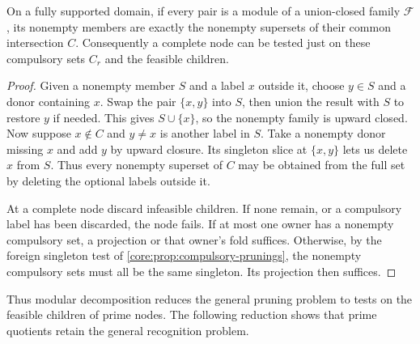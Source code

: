 \begin{proposition}
\label{core:prop:complete-pruning-modules}
On a fully supported domain, if every pair is a module of a
union-closed family $\mathcal F$, its nonempty members are exactly
the nonempty supersets of their common intersection $C$.
Consequently a complete node can be tested just on these compulsory
sets $C_r$ and the feasible children.
\end{proposition}
\begin{proof}
Given a nonempty member $S$ and a label $x$ outside it, choose
$y\in S$ and a donor containing $x$. Swap the pair $\{x,y\}$
into $S$, then union the result with $S$ to restore $y$ if needed.
This gives $S\cup\{x\}$, so the nonempty family is upward closed.
Now suppose $x\notin C$ and $y\ne x$ is another label in $S$.
Take a nonempty donor missing $x$ and add $y$ by upward closure.
Its singleton slice at $\{x,y\}$ lets us delete $x$ from $S$.
Thus every nonempty superset of $C$ may be obtained from the full
set by deleting the optional labels outside it.

At a complete node discard infeasible children. If none remain,
or a compulsory label has been discarded, the node fails. If at
most one owner has a nonempty compulsory set, a projection or that
owner's fold suffices. Otherwise, by the foreign singleton test of
\cref{core:prop:compulsory-prunings}, the nonempty compulsory sets
must all be the same singleton. Its projection then suffices.
\end{proof}

Thus modular decomposition reduces the general pruning problem to
tests on the feasible children of prime nodes. The following reduction
shows that prime quotients
retain the general recognition problem.

